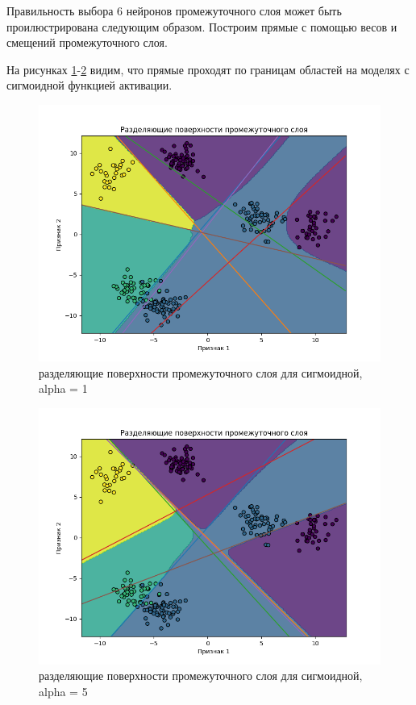 \documentclass[12pt]{report}
\begin{document}
Правильность выбора 6 нейронов промежуточного слоя может быть проилюстрирована следующим образом. Построим прямые с помощью весов и смещений промежуточного слоя. 

На рисунках \ref{fig:div1}-\ref{fig:div5} видим, что прямые проходят по границам областей на моделях с сигмоидной функцией активации.

\begin{figure}[h!]
  \centering
  \includegraphics[width = \linewidth / 2]{img_sigmoid_1_50.png}
  \caption{разделяющие поверхности промежуточного слоя для сигмоидной, alpha = 1}
  \label{fig:div1}
\end{figure}
\newpage

\begin{figure}[h!]
  \centering
  \includegraphics[width = \linewidth / 2]{img_sigmoid_5_50.png}
  \caption{разделяющие поверхности промежуточного слоя для сигмоидной, alpha = 5}
  \label{fig:div5}
\end{figure}
\newpage

\printbibliography[title={СПИСОК ИСПОЛЬЗОВАННЫХ\\ ИСТОЧНИКОВ}]
\end{document}
